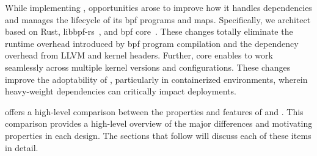While implementing \bpfcontain{}, opportunities arose to improve how it handles
dependencies and manages the lifecycle of its \gls{bpf} programs and maps. Specifically,
we architect \bpfcontain{} based on Rust, libbpf-rs~\cite{libbpf-rs}, and \gls{bpf}
\gls{core}~\cite{nakryiko2020_core}. These changes totally eliminate the runtime overhead
introduced by \gls{bpf} program compilation and the dependency overhead from LLVM and
kernel headers. Further, \gls{core} enables \bpfcontain{} to work seamlessly across
multiple kernel versions and configurations. These changes improve the adoptability of
\bpfcontain{}, particularly in containerized environments, wherein heavy-weight
dependencies can critically impact deployments.

 offers a high-level comparison between the properties and
features of \bpfbox{} and \bpfcontain{}. This comparison provides a high-level overview of
the major differences and motivating properties in each design. The sections that follow
will discuss each of these items in detail.

